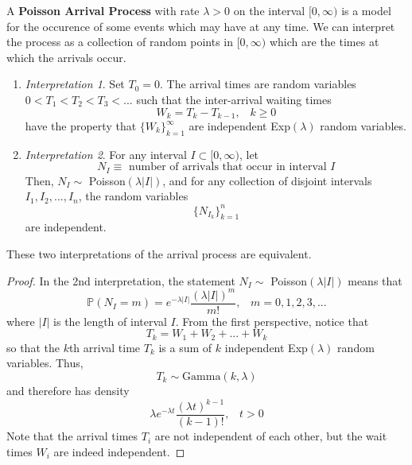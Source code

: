 \documentclass{article}
\begin{document}
    A \textbf{Poisson Arrival Process} with rate $\lambda > 0$ on the interval $[0, \infty)$ is a model for the occurence of some events which may have at any time. We can interpret the process as a collection of random points in $[0, \infty)$ which are the times at which the arrivals occur. 
    \begin{enumerate}
      \item \textit{Interpretation 1}. Set $T_0 = 0$. The arrival times are random variables $0 < T_1 < T_2 < T_3 < ...$ such that the inter-arrival waiting times
      \begin{equation}
        W_k = T_k - T_{k-1}, \;\;\; k \geq 0
      \end{equation}
      have the property that $\{W_k\}_{k=1}^\infty$ are independent Exp$(\lambda)$ random variables. 

      \item \textit{Interpretation 2}. For any interval $I \subset [0, \infty)$, let 
      \begin{equation}
        N_I \equiv \text{ number of arrivals that occur in interval } I
      \end{equation}
      Then, $N_I \sim$ Poisson$(\lambda |I|)$, and for any collection of disjoint intervals $I_1, I_2, ..., I_n$, the random variables 
      \begin{equation}
        \{N_{I_k}\}_{k=1}^n
      \end{equation}
    are independent. 
    \end{enumerate}

    \begin{theorem}
      These two interpretations of the arrival process are equivalent. 
    \end{theorem}
    \begin{proof}
      In the 2nd interpretation, the statement $N_I \sim$ Poisson$(\lambda |I|)$ means that 
      \begin{equation}
        \mathbb{P}(N_I = m) = e^{-\lambda |I|} \frac{(\lambda |I|)^m}{m!}, \;\;\; m = 0, 1, 2, 3, ...
      \end{equation}
      where $|I|$ is the length of interval $I$. From the first perspective, notice that 
      \begin{equation}
        T_k = W_1 + W_2 + ... + W_k
      \end{equation}
      so that the $k$th arrival time $T_k$ is a sum of $k$ independent Exp$(\lambda)$ random variables. Thus, 
      \begin{equation}
        T_k \sim \text{Gamma}(k, \lambda)
      \end{equation}
      and therefore has density
      \begin{equation}
      \lambda e^{-\lambda t} \frac{(\lambda t)^{k-1}}{(k-1)!}, \;\;\; t>0
      \end{equation}
      Note that the arrival times $T_i$ are not independent of each other, but the wait times $W_i$ are indeed independent. 
    \end{proof}
\end{document}

